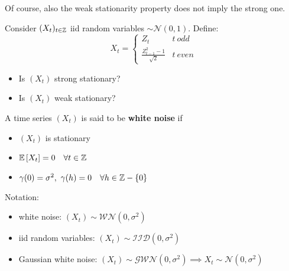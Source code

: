 Of course, also the weak stationarity property does not imply the strong one.

\begin{exercise}
    Consider $(X_t)_{t\in\mathbb{Z}}$ iid random variables $\sim\mathcal{N}(0,1)$. Define:
    \[
        X_t=\begin{cases}Z_t & t\ odd\\\frac{Z_{t-1}^2-1}{\sqrt{2}} & t\ even\end{cases}  
    \]
    \begin{itemize}
        \item Is $(X_t)$ strong stationary?
        \item Is $(X_t)$ weak stationary?
    \end{itemize}
\end{exercise}

\begin{definition}
    A time series $(X_t)$ is said to be \textbf{white noise} if 
    \begin{itemize}
        \item $(X_t)$ is stationary
        \item $\mathbb{E}\left[X_t\right]=0\ \ \ \forall t\in\mathbb{Z}$
        \item $\gamma(0)=\sigma^2,\ \gamma(h)=0\ \ \ \forall h\in\Z-\{0\}$ 
    \end{itemize}
    Notation:
    \begin{itemize}
        \item white noise: $(X_t)\sim\mathcal{WN}(0,\sigma^2)$
        \item iid random variables: $(X_t)\sim\mathcal{IID}(0,\sigma^2)$
        \item Gaussian white noise: $(X_t)\sim\mathcal{GWN}(0,\sigma^2)\implies X_t\sim\mathcal{N}(0,\sigma^2)$
    \end{itemize}
\end{definition}

